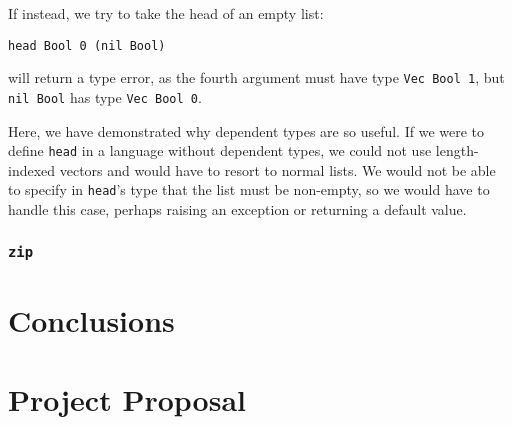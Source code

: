 \documentclass[12pt,a4paper,twoside]{report}
\begin{document}
If instead, we try to take the head of an empty list:
\begin{lstlisting}[gobble=4]
    head Bool 0 (nil Bool)
\end{lstlisting}
\pimu{} will return a type error, as the fourth argument must have type \lstinline{Vec Bool 1}, but \lstinline{nil Bool} has type \lstinline{Vec Bool 0}.

Here, we have demonstrated why dependent types are so useful.
If we were to define \lstinline{head} in a language without dependent types, we could not use length-indexed vectors and would have to resort to normal lists.
We would not be able to specify in \lstinline{head}'s type that the list must be non-empty, so we would have to handle this case, perhaps raising an exception or returning a default value.

\subsection{\texttt{zip}}



\chapter{Conclusions}


\clearpage
{}



\clearpage
\markboth{}{}

\chapter*{Project Proposal}

\end{document}
